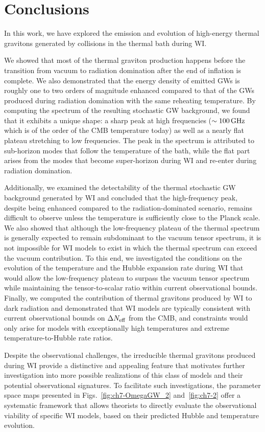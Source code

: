 \medskip
\section{Conclusions}
\label{sec:ch7-conclusions}
In this work, we have explored the emission and evolution of high-energy thermal gravitons generated by collisions in the thermal bath during WI.

We showed that most of the thermal graviton production happens before the transition from vacuum to radiation domination after the end of inflation is complete. We also demonstrated that the energy density of emitted GWs is roughly one to two orders of magnitude enhanced compared to that of the GWs produced during radiation domination with the same reheating temperature. By computing the spectrum of the resulting stochastic GW background, we found that it exhibits a unique shape: a sharp peak at high frequencies ($\sim 100\,{\rm GHz}$ which is of the order of the CMB temperature today) as well as a nearly flat plateau stretching to low frequencies. The peak in the spectrum is attributed to sub-horizon modes that follow
the temperature of the bath, while the flat part arises from the modes that become super-horizon during WI and re-enter during radiation domination.

Additionally, we examined the detectability of the thermal stochastic GW background generated by WI and concluded that the high-frequency peak, despite being enhanced compared to the radiation-dominated scenario, remains difficult to observe unless the temperature is sufficiently close to the Planck scale. We also showed that although the low-frequency plateau of the thermal spectrum is generally expected to remain subdominant to the vacuum tensor spectrum, it is not impossible for WI models to exist in which the thermal spectrum can exceed the vacuum contribution. To this end, we investigated the conditions on the evolution of the temperature and the Hubble expansion rate during WI that would allow the low-frequency plateau to surpass the vacuum tensor spectrum while maintaining the tensor-to-scalar ratio within current observational bounds. Finally, we computed the contribution of thermal gravitons produced by WI to dark radiation and demonstrated that WI models are typically consistent with current observational bounds on $\Delta N_{{\rm eff}}$ from the CMB, and  constraints would only arise for models with exceptionally high temperatures and extreme temperature-to-Hubble rate ratios.

Despite the observational challenges, the irreducible thermal gravitons produced during WI provide a distinctive and appealing feature that motivates further investigation into more possible realizations of this class of models and their potential observational signatures. To facilitate such investigations, the parameter space maps presented in Figs.~\ref{fig:ch7-OmegaGW_2} and~\ref{fig:ch7-2} offer a systematic framework that allows theorists to directly evaluate  the observational viability of specific WI models, based on their predicted Hubble and temperature evolution.


